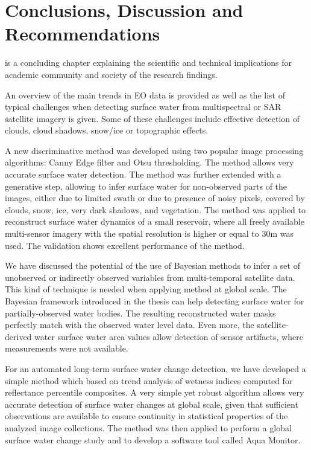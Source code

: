 \chapter{Conclusions, Discussion and Recommendations}
\label{ch8-conclusion}

 is a concluding chapter explaining the scientific and technical implications for academic community and society of the research findings.

An overview of the main trends in EO data is provided as well as the list of typical challenges when detecting surface water from multispectral or SAR satellite imagery is given. Some of these challenges include effective detection of clouds, cloud shadows, snow/ice or topographic effects. 

A new discriminative method was developed using two popular image processing algorithms: Canny Edge filter and Otsu thresholding. The method allows very accurate surface water detection. The method was further extended with a generative step, allowing  to infer surface water for non-observed parts of the images, either due to limited swath or due to presence of noisy pixels, covered by clouds, snow, ice, very dark shadows, and vegetation. The method was applied to reconstruct surface water dynamics of a small reservoir, where all freely available multi-sensor imagery with the spatial resolution is higher or equal to 30m was used. The validation shows excellent performance of the method. 

We have discussed the potential of the use of Bayesian methods to infer a set of unobserved or indirectly observed variables from multi-temporal satellite data. This kind of technique is needed when applying method at global scale. The Bayesian framework introduced in the thesis can help detecting surface water for partially-observed water bodies. The resulting reconstructed water masks perfectly match with the observed water level data. Even more, the satellite-derived water surface water area values allow detection of sensor artifacts, where measurements were not available. 

For an automated long-term surface water change detection, we have developed a simple method which based on trend analysis of wetness indices computed for reflectance percentile composites. A very simple yet robust algorithm allows very accurate detection of surface water changes at global scale, given that sufficient observations are available to ensure continuity in statistical properties of the analyzed image collections. The method was then applied to perform a global surface water change study and to develop a software tool called Aqua Monitor.

